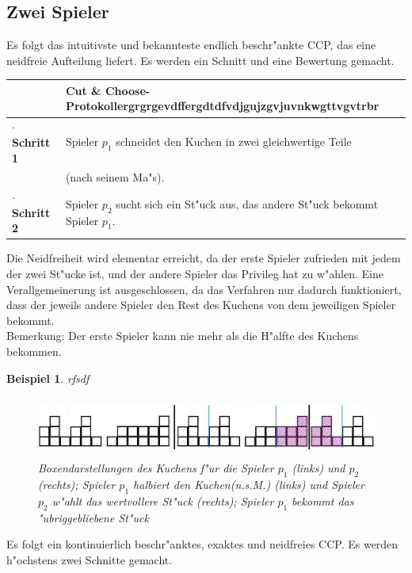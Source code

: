 \documentclass[11pt, a4paper, twoside]{article}
\newcommand{\wf}{\color{white}}
\newcommand{\tf}{\color{black}}
\newtheorem{bsp}[satz]{Beispiel}
\numberwithin{equation}{section}
\begin{document}
\subsection{Zwei Spieler}
Es folgt das intuitivste und bekannteste endlich beschr"ankte CCP, das eine neidfreie Aufteilung liefert. Es werden ein Schnitt und eine Bewertung gemacht.\\
\newline
\begin{tabular}{|ll|}
\hline
&\textbf{Cut \& Choose-Protokoll}\wf ergrgrgevdffergdtdfvdjgujzgvjuvnkwgttvgvtrbr\tf\\
\hline
\textbf{$\cdot$ Schritt 1}&Spieler $p_1$ schneidet den Kuchen in zwei gleichwertige Teile\\&(nach seinem Ma"s).\\
\textbf{$\cdot$ Schritt 2}&Spieler $p_2$ sucht sich ein St"uck aus, das andere St"uck bekommt Spieler $p_1$.\\
\hline
\end{tabular}
\newline
\newline
\newline
Die Neidfreiheit wird elementar erreicht, da der erste Spieler zufrieden mit jedem der zwei St"ucke ist, und der andere Spieler das Privileg hat zu w"ahlen. Eine Verallgemeinerung ist ausgeschlossen, da das Verfahren nur dadurch funktioniert, dass der jeweils andere Spieler den Rest des Kuchens von dem jeweiligen Spieler bekommt.\\Bemerkung: Der erste Spieler kann nie mehr als die H"alfte des Kuchens bekommen.
\begin{bsp}\wf rfsdf
\begin{figure}[h!]
\includegraphics[height=2cm]{cc3.jpg}
\caption[Beispiel zum Cut \& Choose-Protokoll]{Boxendarstellungen des Kuchens f"ur die Spieler $p_1$ (links) und $p_2$ (rechts); Spieler $p_1$ halbiert den Kuchen(n.s.M.) (links) und Spieler $p_2$ w"ahlt das wertvollere St"uck (rechts); Spieler $p_1$ bekommt das "ubriggebliebene St"uck}
\end{figure}
\end{bsp}
Es folgt ein kontinuierlich beschr"anktes, exaktes und neidfreies CCP. Es werden h"ochstens zwei Schnitte gemacht.\\
\end{document}
